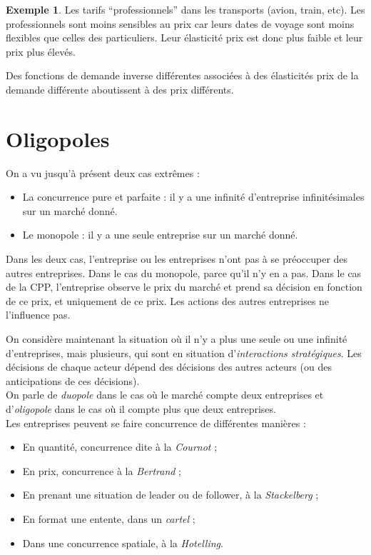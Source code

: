 \documentclass[
]{book}
\providecommand{\tightlist}{%
  \setlength{\itemsep}{0pt}\setlength{\parskip}{0pt}}
\theoremstyle{definition}
\theoremstyle{definition}
\newtheorem{example}{Exemple}[chapter]
\theoremstyle{definition}
\theoremstyle{definition}
\theoremstyle{remark}
\begin{document}
\begin{example}
Les tarifs ``professionnels'' dans les transports (avion, train, etc).
Les professionnels sont moins sensibles au prix car leurs dates de voyage sont moins flexibles que celles des particuliers.
Leur élasticité prix est donc plus faible et leur prix plus élevés.
\end{example}

Des fonctions de demande inverse différentes associées à des élasticités prix de la demande différente aboutissent à des prix différents.

\hypertarget{oligopoles}{%
\chapter{Oligopoles}\label{oligopoles}}

On a vu jusqu'à présent deux cas extrêmes :

\begin{itemize}
\tightlist
\item
  La concurrence pure et parfaite :
  il y a une infinité d'entreprise infinitésimales sur un marché donné.
\item
  Le monopole : il y a une seule entreprise sur un marché donné.
\end{itemize}

Dans les deux cas, l'entreprise ou les entreprises n'ont pas à se préoccuper des autres entreprises.
Dans le cas du monopole, parce qu'il n'y en a pas.
Dans le cas de la CPP, l'entreprise observe le prix du marché et prend sa décision en fonction de ce prix, et uniquement de ce prix.
Les actions des autres entreprises ne l'influence pas.

On considère maintenant la situation où il n'y a plus une seule ou une infinité d'entreprises, mais plusieurs, qui sont en situation d'\emph{interactions stratégiques}.
Les décisions de chaque acteur dépend des décisions des autres acteurs (ou des anticipations de ces décisions).\\
On parle de \emph{duopole} dans le cas où le marché compte deux entreprises et d'\emph{oligopole} dans le cas où il compte plus que deux entreprises.\\
Les entreprises peuvent se faire concurrence de différentes manières :

\begin{itemize}
\tightlist
\item
  En quantité, concurrence dite à la \emph{Cournot} ;
\item
  En prix, concurrence à la \emph{Bertrand} ;
\item
  En prenant une situation de leader ou de follower, à la \emph{Stackelberg} ;
\item
  En format une entente, dans un \emph{cartel} ;
\item
  Dans une concurrence spatiale, à la \emph{Hotelling}.
\end{itemize}
\end{document}
